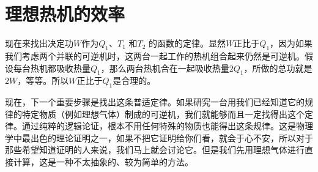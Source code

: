 \section{理想热机的效率}

现在来找出决定功$W$作为$Q_1$、$T_1$ 和$T_2$ 的函数的定律。显然$W$正比于$Q_1$，因为如果我们考虑两个并联的可逆机时，这两台一起工作的热机组合起来仍然是可逆机。假设每台热机都吸收热量$Q_1$，那么两台热机合在一起吸收热量$2Q_1$，所做的总功就是$2W$，等等。所以$W$正比于$Q_1$是合理的。

现在，下一个重要步骤是找出这条普适定律。如果研究一台用我们已经知道它的规律的特定物质（例如理想气体）制成的可逆机，我们就能够而且一定找得出这个定律。通过纯粹的逻辑论证，根本不用任何特殊的物质也能得出这条规律。这是物理学中最出色的理论证明之一，如果不把它证明给你们看，就会于心不安，所以对于那些希望知道证明的人来说，我们马上就会讨论它。但是我们先用理想气体进行直接计算，这是一种不太抽象的、较为简单的方法。

